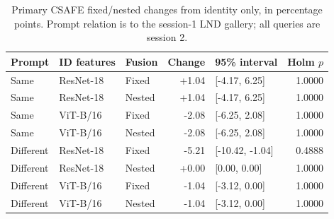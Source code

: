 \documentclass[10pt,a4paper]{article}
\begin{document}
\begin{table}[ht]
\caption{Primary CSAFE fixed/nested changes from identity only, in percentage points. Prompt relation is to the session-1 LND gallery; all queries are session 2.}\label{tab:csafetests}
\centering\small
\begin{tabular}{lllrlr}\toprule
Prompt & ID features & Fusion & Change & 95\% interval & Holm $p$\\\midrule
Same & ResNet-18 & Fixed & +1.04 & [-4.17, 6.25] & 1.0000 \\
Same & ResNet-18 & Nested & +1.04 & [-4.17, 6.25] & 1.0000 \\
Same & ViT-B/16 & Fixed & -2.08 & [-6.25, 2.08] & 1.0000 \\
Same & ViT-B/16 & Nested & -2.08 & [-6.25, 2.08] & 1.0000 \\
Different & ResNet-18 & Fixed & -5.21 & [-10.42, -1.04] & 0.4888 \\
Different & ResNet-18 & Nested & +0.00 & [0.00, 0.00] & 1.0000 \\
Different & ViT-B/16 & Fixed & -1.04 & [-3.12, 0.00] & 1.0000 \\
Different & ViT-B/16 & Nested & -1.04 & [-3.12, 0.00] & 1.0000 \\
\bottomrule
\end{tabular}
\end{table}
\end{document}
